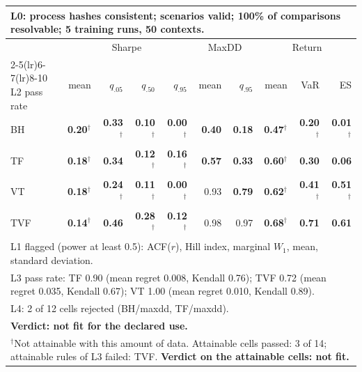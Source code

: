 \begin{tabular}{lrrrrrrrrr}
\toprule
\multicolumn{10}{p{13.5cm}}{L0: process hashes consistent; scenarios valid; 100\% of comparisons resolvable; 5 training runs, 50 contexts.} \\
\midrule
 & \multicolumn{4}{c}{Sharpe} & \multicolumn{2}{c}{MaxDD} & \multicolumn{3}{c}{Return} \\
\cmidrule(lr){2-5}\cmidrule(lr){6-7}\cmidrule(lr){8-10}
L2 pass rate & mean & $q_{.05}$ & $q_{.50}$ & $q_{.95}$ & mean & $q_{.95}$ & mean & VaR & ES \\
\midrule
BH & \textbf{0.20}$^{\dagger}$ & \textbf{0.33}$^{\dagger}$ & \textbf{0.10}$^{\dagger}$ & \textbf{0.00}$^{\dagger}$ & \textbf{0.40} & \textbf{0.18} & \textbf{0.47}$^{\dagger}$ & \textbf{0.20}$^{\dagger}$ & \textbf{0.01}$^{\dagger}$ \\
TF & \textbf{0.18}$^{\dagger}$ & \textbf{0.34} & \textbf{0.12}$^{\dagger}$ & \textbf{0.16}$^{\dagger}$ & \textbf{0.57} & \textbf{0.33} & \textbf{0.60}$^{\dagger}$ & \textbf{0.30} & \textbf{0.06} \\
VT & \textbf{0.18}$^{\dagger}$ & \textbf{0.24}$^{\dagger}$ & \textbf{0.11}$^{\dagger}$ & \textbf{0.00}$^{\dagger}$ & 0.93 & \textbf{0.79} & \textbf{0.62}$^{\dagger}$ & \textbf{0.41}$^{\dagger}$ & \textbf{0.51}$^{\dagger}$ \\
TVF & \textbf{0.14}$^{\dagger}$ & \textbf{0.46} & \textbf{0.28}$^{\dagger}$ & \textbf{0.12}$^{\dagger}$ & 0.98 & 0.97 & \textbf{0.68}$^{\dagger}$ & \textbf{0.71} & \textbf{0.61} \\
\midrule
\multicolumn{10}{p{13.5cm}}{L1 flagged (power at least 0.5): ACF($r$), Hill index, marginal $W_1$, mean, standard deviation.} \\
\multicolumn{10}{p{13.5cm}}{L3 pass rate: TF 0.90 (mean regret 0.008, Kendall 0.76); TVF 0.72 (mean regret 0.035, Kendall 0.67); VT 1.00 (mean regret 0.010, Kendall 0.89).} \\
\multicolumn{10}{p{13.5cm}}{L4: 2 of 12 cells rejected (BH/maxdd, TF/maxdd).} \\
\multicolumn{10}{p{13.5cm}}{\textbf{Verdict: not fit for the declared use.}} \\
\multicolumn{10}{p{13.5cm}}{$^{\dagger}$Not attainable with this amount of data. Attainable cells passed: 3 of 14; attainable rules of L3 failed: TVF. \textbf{Verdict on the attainable cells: not fit.}} \\
\bottomrule
\end{tabular}
